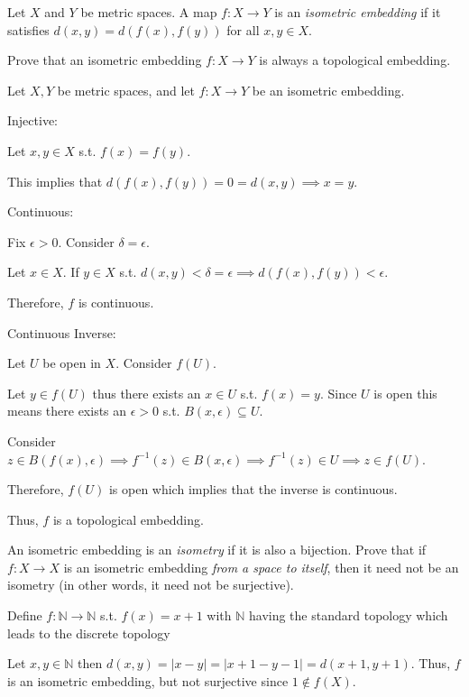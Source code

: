 \documentclass[12pt, letterpaper]{article}
\newcommand{\N}{\mathbb{N}}
\begin{document}
\begin{problem}{}
    Let $X$ and $Y$ be metric spaces. A map $f:X \to Y$ is an
  \emph{isometric embedding} if it satisfies $d(x,y) = d(f(x), f(y))$
  for all $x, y \in X$.
\end{problem}
\begin{subproblem}{}
    Prove that an isometric embedding $f:X \to Y$ is always a
    topological embedding.
\end{subproblem}
\begin{problemproof}
    Let $X,Y$ be metric spaces, and let $f:X \to Y$ be an isometric embedding.

    Injective:

    Let $x,y \in X$ s.t. $f(x)=f(y)$.

    This implies that $d(f(x),f(y))=0=d(x,y) \implies x=y$.

    Continuous:

    Fix $\epsilon > 0$. Consider $\delta=\epsilon$.

    Let $x \in X$. If $y \in X$ s.t. $d(x,y) < \delta=\epsilon \implies d(f(x),f(y))<\epsilon$.

    Therefore, $f$ is continuous.

    Continuous Inverse:

    Let $U$ be open in $X$. Consider $f(U)$.

    Let $y \in f(U)$ thus there exists an $x \in U$ s.t. $f(x)=y$. Since $U$ is open this means there exists an $\epsilon > 0$ s.t. $B(x,\epsilon) \subseteq U$.

    Consider $z \in B(f(x),\epsilon) \implies f^{-1}(z) \in B(x,\epsilon) \implies f^{-1}(z) \in U \implies z \in f(U)$.

    Therefore, $f(U)$ is open which implies that the inverse is continuous.

    Thus, $f$ is a topological embedding.
\end{problemproof}

\begin{subproblem}{}
    An isometric embedding is an \emph{isometry} if it is also a
    bijection. Prove that if $f:X \to X$ is an isometric embedding
    \emph{from a space to itself}, then it need not be an isometry (in
    other words, it need not be surjective).
\end{subproblem}
\begin{problemproof}
    Define $f : \N \to \N$ s.t. $f(x)=x+1$ with $\N$ having the standard topology which leads to the discrete topology

    Let $x,y \in \N$ then $d(x,y)=|x-y|=|x+1-y-1|=d(x+1,y+1)$. Thus, $f$ is an isometric embedding, but not surjective since $1 \notin f(X)$.
\end{problemproof}
\end{document}
